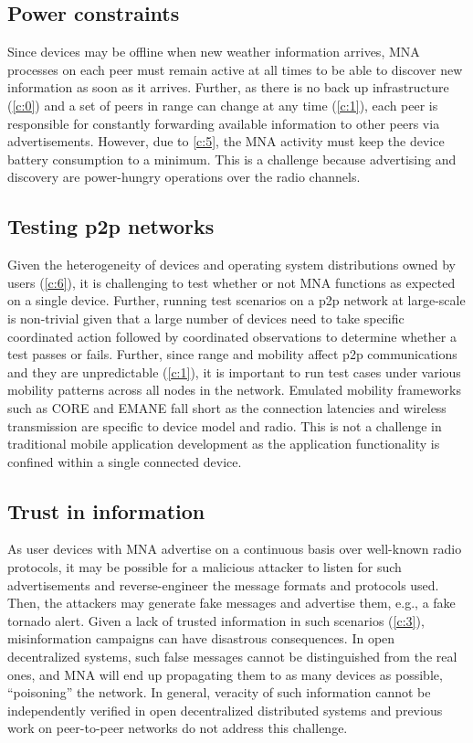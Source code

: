 \documentclass[conference]{IEEEtran}
\begin{document}
\subsection{Power constraints}
\label{ch:power}
%
Since devices may be offline when new weather information arrives, MNA
processes on each peer must remain active at all times to be able to
discover new information as soon as it arrives. Further, as there is
no back up infrastructure (\ref{c:0}) and a set of peers in range can
change at any time (\ref{c:1}), each peer is responsible for
constantly forwarding available information to other peers via
advertisements. However, due to \ref{c:5}, the MNA activity must keep
the device battery consumption to a minimum. This is a challenge
because advertising and discovery are power-hungry operations over the
radio channels.
%
\subsection{Testing p2p networks}
%
Given the heterogeneity of devices and operating system distributions
owned by users (\ref{c:6}), it is challenging to test whether or not
MNA functions as expected on a single device. Further, running test
scenarios on a p2p network at large-scale is non-trivial given that a
large number of devices need to take specific coordinated action
followed by coordinated observations to determine whether a test
passes or fails. Further, since range and mobility affect p2p
communications and they are unpredictable (\ref{c:1}), it is important
to run test cases under various mobility patterns across all nodes in
the network. Emulated mobility frameworks such as CORE
\cite{arenholz-core-2008} and EMANE \cite{emane} fall short as the
connection latencies and wireless transmission are specific to device
model and radio. This is not a challenge in traditional mobile
application development as the application functionality is confined
within a single connected device.
%
\subsection{Trust in information}
%
As user devices with MNA advertise on a continuous basis over
well-known radio protocols, it may be possible for a malicious
attacker to listen for such advertisements and reverse-engineer the
message formats and protocols used. Then, the attackers may generate
fake messages and advertise them, e.g., a fake tornado alert. Given a
lack of trusted information in such scenarios (\ref{c:3}),
misinformation campaigns can have disastrous consequences.  In open
decentralized systems, such false messages cannot be distinguished
from the real ones, and MNA will end up propagating them to as many
devices as possible, ``poisoning'' the network. In general, veracity
of such information cannot be independently verified in open
decentralized distributed systems and previous work on peer-to-peer
networks do not address this challenge.
%
\end{document}
